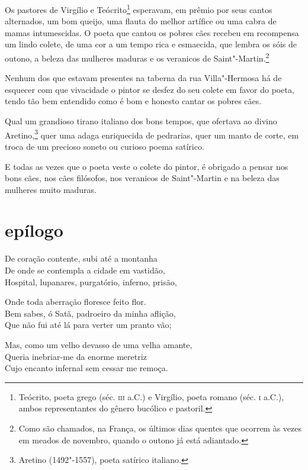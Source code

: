 Os pastores de Virgílio e Teócrito\protect\footnote{ Teócrito, poeta grego (séc. 
\textsc{iii} a.C.) e Virgílio, poeta romano (séc. \textsc{i} a.C.), 
ambos representantes do gênero bucólico e pastoril.} esperavam, em
prêmio por seus cantos alternados, um bom queijo, uma flauta do melhor
artífice ou uma cabra de mamas intumescidas. O poeta que cantou os
pobres cães recebeu em recompensa um lindo colete, de uma cor a um
tempo rica e esmaecida, que lembra os sóis de outono, a beleza das
mulheres maduras e os veranicos de Saint"-Martin.\protect\footnote{ Como são chamados, na França, os
últimos dias quentes que ocorrem às vezes em meados de novembro, quando
o outono já está adiantado.}

Nenhum dos que estavam presentes na taberna da rua Villa"-Hermosa
há de esquecer com que vivacidade o pintor se desfez do seu colete em favor
do poeta, tendo tão bem entendido como é bom e honesto cantar os pobres
cães.

Qual um grandioso tirano italiano dos bons tempos, que ofertava ao divino
Aretino,\protect\footnote{ Aretino (1492"-1557), poeta satírico italiano.}
quer uma adaga enriquecida de pedrarias,
quer um manto de corte, em troca de um precioso soneto ou curioso
poema satírico.

E todas as vezes que o poeta veste o colete do pintor, é obrigado a
pensar nos bons cães, nos cães filósofos, nos veranicos de
Saint"-Martin e na beleza das mulheres muito maduras.

\quebra\section[Epílogo]{epílogo}

\bigskip

\noindent De coração contente, subi até a montanha\\
De onde se contempla a cidade em vastidão,\\
Hospital, lupanares, purgatório, inferno, prisão,\\\medskip

\noindent Onde toda aberração floresce feito flor.\\
Bem sabes, ó Satã, padroeiro da minha aflição,\\
Que não fui até lá para verter um pranto vão;\\\medskip

\noindent Mas, como um velho devasso de uma velha amante,\\
Queria inebriar-me da enorme meretriz\\
Cujo encanto infernal sem cessar me remoça.\\\medskip

